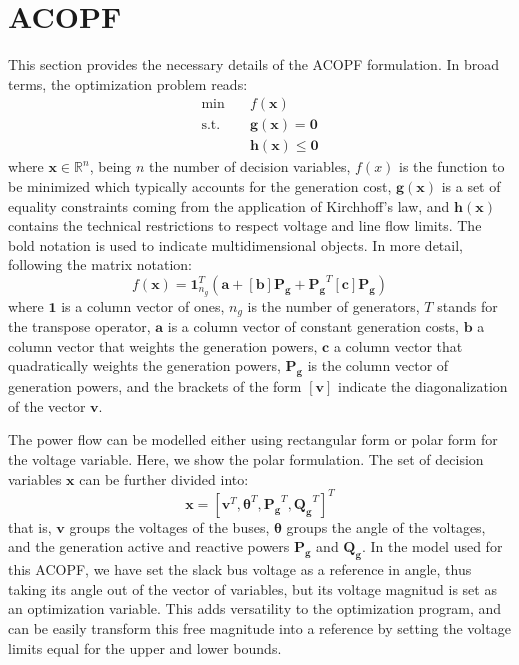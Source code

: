 \documentclass{article}
\begin{document}
\section{ACOPF}
This section provides the necessary details of the ACOPF formulation. In broad terms, the optimization problem reads: 
\begin{equation}
\begin{split}
    \text{min} \quad & f(\bm{x}) \\
    \text{s.t.} \quad & \bm{g}(\bm{x}) = \bm{0} \\
     & \bm{h}(\bm{x}) \leq \bm{0}
\end{split}
\end{equation}
where $\bm{x} \in \mathbb{R}^n$, being $n$ the number of decision variables, $f(x)$ is the function to be minimized which typically accounts for the generation cost, $\bm{g}(\bm{x})$ is a set of equality constraints coming from the application of Kirchhoff's law, and $\bm{h}(\bm{x})$ contains the technical restrictions to respect voltage and line flow limits. The bold notation is used to indicate multidimensional objects. In more detail, following the matrix notation:
\begin{equation}
    f(\bm{x}) = \bm{1}^T_{n_g} (\bm{a} + [\bm{b}]\bm{P_g} + \bm{P_g}^T [\bm{c}] \bm{P_g})
\end{equation}
where $\bm{1}$ is a column vector of ones, $n_g$ is the number of generators, $T$ stands for the transpose operator, $\bm{a}$ is a column vector of constant generation costs, $\bm{b}$ a column vector that weights the generation powers, $\bm{c}$ a column vector that quadratically weights the generation powers, $\bm{P_g}$ is the column vector of generation powers, and the brackets of the form $[\bm{v}]$ indicate the diagonalization of the vector $\bm{v}$. 

The power flow can be modelled either using rectangular form or polar form for the voltage variable. Here, we show the polar formulation. The set of decision variables $\bm{x}$ can be further divided into:
\begin{equation}
    \bm{x} = [\bm{v}^T, \bm{\theta}^T, \bm{P_g}^T, \bm{Q_g}^T]^T
\end{equation}
that is, $\bm{v}$ groups the voltages of the buses, $\bm{\theta}$ groups the angle of the voltages, and the generation active and reactive powers $\bm{P_g}$ and $\bm{Q_g}$. In the model used for this ACOPF, we have set the slack bus voltage as a reference in angle, thus taking its angle out of the vector of variables, but its voltage magnitud is set as an optimization variable.
This adds versatility to the optimization program, and can be easily transform this free magnitude into a reference by setting the voltage limits equal for the upper and lower bounds.
\end{document}
